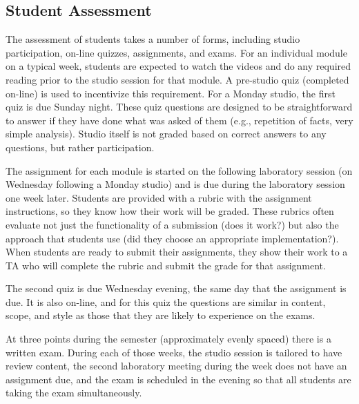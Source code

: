 \subsection{Student Assessment}

The assessment of students takes a number of forms, including studio
participation, on-line quizzes, assignments, and exams.
For an individual module on a typical week,
students are expected to watch the videos
and do any required reading prior to the studio session for that module.
A pre-studio quiz (completed on-line) is used to incentivize this
requirement.  For a Monday studio, the first quiz is due Sunday night.
These quiz questions are designed to be straightforward to answer if
they have done what was asked of them (e.g., repetition of facts,
very simple analysis).
Studio itself is not graded based on correct answers to any questions, but
rather participation.

The assignment for each module is started on the
following laboratory session (on Wednesday following a Monday studio)
and is due during the laboratory session one week later.
Students are provided with a rubric with the assignment instructions,
so they know how their work will be graded. These rubrics often evaluate
not just the functionality of a submission (does it work?) but also the approach
that students use (did they choose an appropriate implementation?).
When
students are ready to submit their assignments, they show their work
to a TA who will complete the rubric and submit the grade for that assignment.

The second quiz is due Wednesday evening, the same day that the assignment
is due. It is also on-line, and for this quiz the questions are 
similar in content, scope, and style as those that they are likely to
experience on the exams. 

At three points during the semester (approximately evenly spaced) there
is a written exam.  During each of those weeks, the
studio session is tailored to have review content, the second laboratory
meeting during the week does not have an assignment due, and the
exam is scheduled in the evening so that all students are taking the
exam simultaneously.
